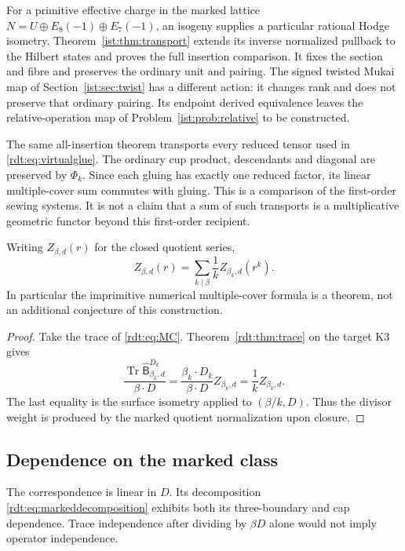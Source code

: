 For a primitive effective charge in the marked lattice
\(N=U\oplus E_8(-1)\oplus E_7(-1)\), an isogeny supplies a
particular rational Hodge isometry.
Theorem~\ref{ist:thm:transport} extends its inverse normalized
pullback to the Hilbert states and proves the full insertion comparison.
It fixes the section and fibre and preserves the ordinary unit and pairing.
The signed twisted Mukai map of
Section~\ref{ist:sec:twist} has a different action:
it changes rank and does not preserve that ordinary pairing.
Its endpoint derived equivalence leaves the relative-operation map
of Problem~\ref{ist:prob:relative} to be constructed.

The same all-insertion theorem transports every reduced tensor used in
\eqref{rdt:eq:virtualglue}. The ordinary cup product, descendants and
diagonal are preserved by $\Phi_k$. Since each gluing has exactly one
reduced factor, its linear multiple-cover sum commutes with gluing.
This is a comparison of the first-order sewing systems. It is not a
claim that a sum of such transports is a multiplicative geometric
functor beyond this first-order recipient.

\begin{corollary}\label{rdt:cor:closedMC}
Writing $Z_{\beta,d}(r)$ for the closed quotient series,
\begin{equation}\label{rdt:eq:closedMC}
 Z_{\beta,d}(r)=\sum_{k\mid\beta}\frac1k Z_{\beta_k,d}(r^k).
\end{equation}
In particular the imprimitive numerical multiple-cover formula is a
theorem, not an additional conjecture of this construction.
\end{corollary}
\begin{proof}
Take the trace of \eqref{rdt:eq:MC}. Theorem~\ref{rdt:thm:trace}
on the target K3 gives
\[
 \frac{\operatorname{Tr}\widehat{\mathsf B}^{D_k}_{\beta_k,d}}{\beta\cdot D}
 =\frac{\beta_k\cdot D_k}{\beta\cdot D}Z_{\beta_k,d}
 =\frac1k Z_{\beta_k,d}.
\]
The last equality is the surface isometry applied to
$(\beta/k,D)$. Thus the divisor weight is produced by the marked
quotient normalization upon closure.
\end{proof}

\subsection{Dependence on the marked class}

The correspondence is linear in $D$. Its decomposition
\eqref{rdt:eq:markeddecomposition} exhibits both its three-boundary
and cap dependence. Trace independence after dividing by $\beta D$
alone would not imply operator independence.

